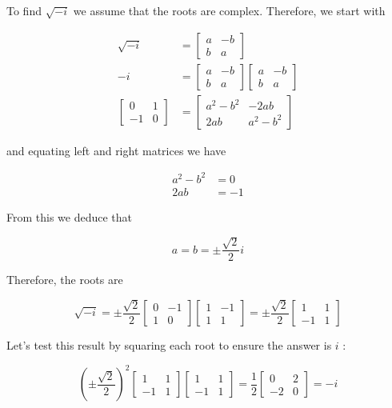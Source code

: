 \documentclass[10pt]{article}
\begin{document}
To find $\sqrt{-i}$ we assume that the roots are complex. Therefore, we start with

$$
\begin{aligned}
\sqrt{-i} & =\left[\begin{array}{cc}
a & -b \\
b & a
\end{array}\right] \\
-i & =\left[\begin{array}{cc}
a & -b \\
b & a
\end{array}\right]\left[\begin{array}{cc}
a & -b \\
b & a
\end{array}\right] \\
{\left[\begin{array}{cc}
0 & 1 \\
-1 & 0
\end{array}\right] } & =\left[\begin{array}{cc}
a^{2}-b^{2} & -2 a b \\
2 a b & a^{2}-b^{2}
\end{array}\right]
\end{aligned}
$$

and equating left and right matrices we have

$$
\begin{aligned}
a^{2}-b^{2} & =0 \\
2 a b & =-1
\end{aligned}
$$

From this we deduce that

$$
a=b= \pm \frac{\sqrt{2}}{2} i
$$

Therefore, the roots are

$$
\sqrt{-i}= \pm \frac{\sqrt{2}}{2}\left[\begin{array}{cc}
0 & -1 \\
1 & 0
\end{array}\right]\left[\begin{array}{cc}
1 & -1 \\
1 & 1
\end{array}\right]= \pm \frac{\sqrt{2}}{2}\left[\begin{array}{cc}
1 & 1 \\
-1 & 1
\end{array}\right]
$$

Let's test this result by squaring each root to ensure the answer is $i$ :

$$
\left( \pm \frac{\sqrt{2}}{2}\right)^{2}\left[\begin{array}{cc}
1 & 1 \\
-1 & 1
\end{array}\right]\left[\begin{array}{cc}
1 & 1 \\
-1 & 1
\end{array}\right]=\frac{1}{2}\left[\begin{array}{cc}
0 & 2 \\
-2 & 0
\end{array}\right]=-i
$$
\end{document}
